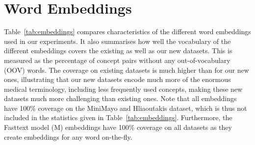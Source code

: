 \documentclass[letterpaper]{article} %
\begin{document}
\onecolumn


\section{Word Embeddings}
Table~\ref{tab:embeddings} compares characteristics of the different word embeddings used in our experiments.
It also summarises how well the vocabulary of the different embeddings covers the existing as well as our new datasets.
This is measured as the percentage of concept pairs without any out-of-vocabulary (OOV) words.
The coverage on existing datasets is much higher than for our new ones, illustrating that our new datasets encode much more of the enormous medical terminology, including less frequently used concepts, making these new datasets much more challenging than existing ones.
Note that all embeddings have 100\% coverage on the MiniMayo and Hliaoutakis dataset, which is thus not included in the statistics given in Table~\ref{tab:embeddings}.
Furthermore, the Fasttext model (M) embeddings have 100\% coverage on all datasets as they create embeddings for any word on-the-fly.
\end{document}
